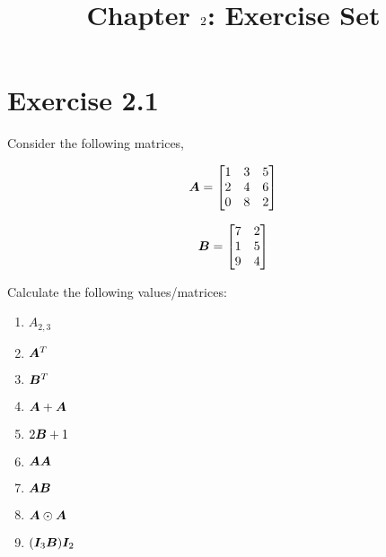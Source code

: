 \documentclass{article}
\author{}
\title{}
\date{\vspace{-5ex}}
\title{Chapter $\chapnumber$: Exercise Set}
\newcommand{\chapnumber}{2}
\begin{document}
\maketitle

\section*{Exercise \chapnumber.1}
Consider the following matrices,

\begin{equation}
{\bm{A}}
=
\begin{bmatrix}
    1 & 3 & 5 \\
    2 & 4 & 6 \\
    0 & 8 & 2 
\end{bmatrix}
\end{equation}

\begin{equation}
{\bm{B}}
=
\begin{bmatrix}
    7 & 2 \\
    1 & 5 \\
    9 & 4 
\end{bmatrix}
\end{equation}

Calculate the following values/matrices:

\begin{enumerate}[label=(\alph*)]

\item $\textit{A}_{2,3}$
\item ${\bm{A}}^T$
\item ${\bm{B}}^T$
\item ${\bm{A}}+{\bm{A}}$
\item $2{\bm{B}}+1$
\item ${\bm{A}}{\bm{A}}$
\item ${\bm{A}}{\bm{B}}$
\item ${\bm{A}}\odot{\bm{A}}$
\item $({\bm{I}}_{3}{\bm{B}}){\bm{I}}_{2}$

\end{enumerate} 
\end{document}
